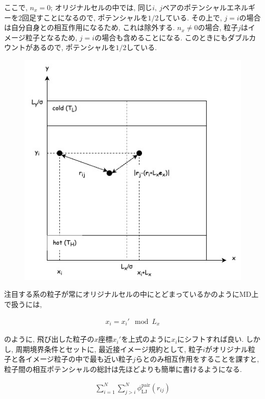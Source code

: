 ここで, $n_x = 0$; オリジナルセルの中では, 同じ$i,\ j$ペアのポテンシャルエネルギーを2回足すことになるので, ポテンシャルを$1/2$している. その上で, $j = i$の場合は自分自身との相互作用になるため, これは除外する. $n_x \neq 0$の場合, 粒子$j$はイメージ粒子となるため, $j=i$の場合も含めることになる. このときにもダブルカウントがあるので, ポテンシャルを$1/2$している. 

\begin{figure}[H]
  \centering
  \caption{}
  \label{fig:system_periodic}
  \includegraphics[scale=0.7]{image/system_periodic.jpg}
\end{figure}

注目する系の粒子が常にオリジナルセルの中にとどまっているかのようにMD上で扱うには,

\begin{align}
  x_{i} = x_{i}' \mod L_{x} 
\end{align}

のように,  飛び出した粒子の$x$座標$x_{i}'$を上式のように$x_i$にシフトすれば良い. しかし, 周期境界条件とセットに, 最近接イメージ規約として, 粒子$i$がオリジナル粒子と各イメージ粒子の中で最も近い粒子$j$らとのみ相互作用をすることを課すと, 粒子間の相互ポテンシャルの総計は先ほどよりも簡単に書けるようになる.

\begin{align}
  \sum_{i=1}^{N} \sum_{j > i}^{N} \phi_{\text{LJ}}^{\text{pair}} (r_{ij})
\end{align}

